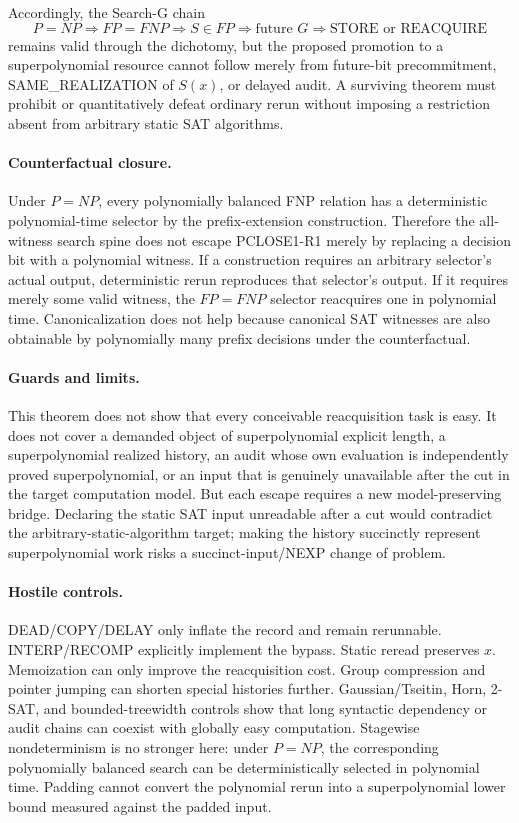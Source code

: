 \documentclass[11pt]{article}
\begin{document}
Accordingly, the Search-G chain
\[
P=NP\Rightarrow FP=FNP\Rightarrow S\in FP\Rightarrow
\text{future }G\Rightarrow\text{STORE or REACQUIRE}
\]
remains valid through the dichotomy, but the proposed promotion to a superpolynomial resource cannot follow merely from future-bit precommitment, SAME\_REALIZATION of $S(x)$, or delayed audit. A surviving theorem must prohibit or quantitatively defeat ordinary rerun without imposing a restriction absent from arbitrary static SAT algorithms.

\paragraph{Counterfactual closure.}
Under $P=NP$, every polynomially balanced FNP relation has a deterministic polynomial-time selector by the prefix-extension construction. Therefore the all-witness search spine does not escape PCLOSE1-R1 merely by replacing a decision bit with a polynomial witness. If a construction requires an arbitrary selector's actual output, deterministic rerun reproduces that selector's output. If it requires merely some valid witness, the $FP=FNP$ selector reacquires one in polynomial time. Canonicalization does not help because canonical SAT witnesses are also obtainable by polynomially many prefix decisions under the counterfactual.

\paragraph{Guards and limits.}
This theorem does not show that every conceivable reacquisition task is easy. It does not cover a demanded object of superpolynomial explicit length, a superpolynomial realized history, an audit whose own evaluation is independently proved superpolynomial, or an input that is genuinely unavailable after the cut in the target computation model. But each escape requires a new model-preserving bridge. Declaring the static SAT input unreadable after a cut would contradict the arbitrary-static-algorithm target; making the history succinctly represent superpolynomial work risks a succinct-input/NEXP change of problem.

\paragraph{Hostile controls.}
DEAD/COPY/DELAY only inflate the record and remain rerunnable. INTERP/RECOMP explicitly implement the bypass. Static reread preserves $x$. Memoization can only improve the reacquisition cost. Group compression and pointer jumping can shorten special histories further. Gaussian/Tseitin, Horn, 2-SAT, and bounded-treewidth controls show that long syntactic dependency or audit chains can coexist with globally easy computation. Stagewise nondeterminism is no stronger here: under $P=NP$, the corresponding polynomially balanced search can be deterministically selected in polynomial time. Padding cannot convert the polynomial rerun into a superpolynomial lower bound measured against the padded input.
\end{document}
